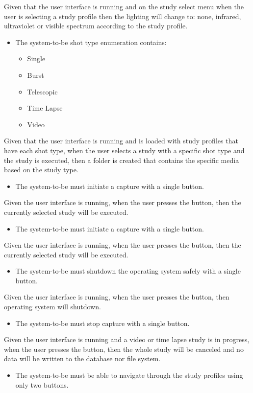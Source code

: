 Given that the user interface is running and on the study select menu when the user is selecting a study profile then the lighting will change to: none, infrared, ultraviolet or visible spectrum according to the study profile.
\begin{itemize}
	\item The system-to-be shot type enumeration contains:
	      \begin{itemize}
		      \item Single
		      \item Burst
		      \item Telescopic
		      \item Time Lapse
		      \item Video
	      \end{itemize}
\end{itemize}
Given that the user interface is running and is loaded with study profiles that have each shot type, when the user selects a study with a specific shot type and the study is executed, then a folder is created that contains the specific media based on the study type.
\begin{itemize}
	\item The system-to-be must initiate a capture with a single button.
\end{itemize}
Given the user interface is running, when the user presses the button, then the currently selected study will be executed.
\begin{itemize}
	\item The system-to-be must initiate a capture with a single button.
\end{itemize}
Given the user interface is running, when the user presses the button, then the currently selected study will be executed.
\begin{itemize}
	\item The system-to-be must shutdown the operating system safely with a single button.
\end{itemize}
Given the user interface is running, when the user presses the button, then operating system will shutdown.
\begin{itemize}
	\item The system-to-be must stop capture with a single button.
\end{itemize}
Given the user interface is running and a video or time lapse study is in progress, when the user presses the button, then the whole study will be canceled and no data will be written to the database nor file system.
\begin{itemize}
	\item The system-to-be must be able to navigate through the study profiles using only two buttons.
\end{itemize}
